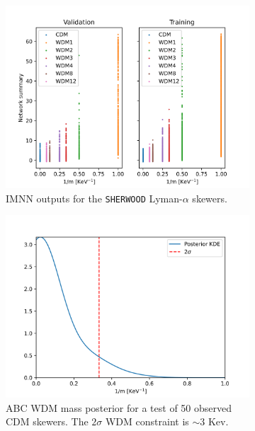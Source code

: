 \begin{figure}
    \centering
    \begin{subfigure}[b]{0.53\textwidth}
        \centering
            \includegraphics[width=1\textwidth]{img/ML/IMNN_output.png}
            \caption{IMNN outputs for the \texttt{SHERWOOD} Lyman-$\alpha$ skewers.}
    \end{subfigure}
    \hfill
    \begin{subfigure}[b]{0.45\textwidth}
        \centering
        \includegraphics[width=1\textwidth]{img/ML/IMNN_ABC_wdm.png}
        \caption{ABC WDM mass posterior for a test of 50 observed CDM skewers. The $2\sigma$ WDM constraint is $\sim 3 $ Kev.}     
    \end{subfigure}
        \caption{}
        \label{fig:IMNN WDM posterior}
\end{figure}

